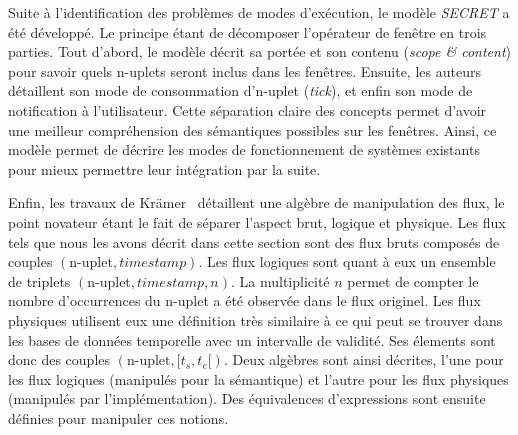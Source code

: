 Suite à l'identification des problèmes de modes d'exécution, le modèle \textit{SECRET} a été développé. Le principe étant de décomposer l'opérateur de fenêtre en trois parties. Tout d'abord, le modèle décrit sa portée et son contenu (\textit{scope \& content}) pour savoir quels n-uplets seront inclus dans les fenêtres. Ensuite, les auteurs détaillent son mode de consommation d'n-uplet (\textit{tick}), et enfin son mode de notification à l'utilisateur. Cette séparation claire des concepts permet d'avoir une meilleur compréhension des sémantiques possibles sur les fenêtres. Ainsi, ce modèle permet de décrire les modes de fonctionnement de systèmes existants pour mieux permettre leur intégration par la suite.

Enfin, les travaux de Krämer~\cite{Kramer:semantics} détaillent une algèbre de manipulation des flux, le point novateur étant le fait de séparer l'aspect brut, logique et physique. Les flux tels que nous les avons décrit dans cette section sont des flux bruts composés de couples $(\textrm{n-uplet},\textit{timestamp})$. Les flux logiques sont quant à eux un ensemble de triplets $(\textrm{n-uplet}, \textit{timestamp}, n)$. La multiplicité $n$ permet de compter le nombre d'occurrences du n-uplet a été observée dans le flux originel. Les flux physiques utilisent eux une définition très similaire à ce qui peut se trouver dans les bases de données temporelle avec un intervalle de validité. Ses élements sont donc des couples $(\textrm{n-uplet},[t_s, t_e[)$. Deux algèbres sont ainsi décrites, l'une pour les flux logiques (manipulés pour la sémantique) et l'autre pour les flux physiques (manipulés par l'implémentation). Des équivalences d'expressions sont ensuite définies pour manipuler ces notions.


